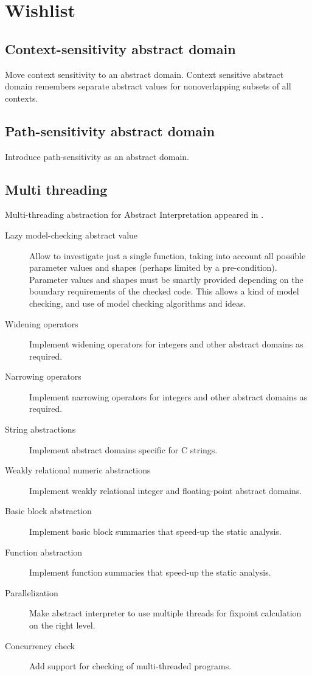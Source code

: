 \documentclass[a4paper]{book}
\begin{document}
\chapter{Wishlist}

\section{Context-sensitivity abstract domain}
Move context sensitivity to an abstract domain.  Context sensitive
abstract domain remembers separate abstract values for nonoverlapping
subsets of all contexts.

\section{Path-sensitivity abstract domain}
Introduce path-sensitivity as an abstract domain.

\section{Multi threading}
Multi-threading abstraction for Abstract Interpretation appeared in
\cite{M11}.

\begin{description}
\item[Lazy model-checking abstract value] Allow to investigate just a
  single function, taking into account all possible parameter values
  and shapes (perhaps limited by a pre-condition).  Parameter values
  and shapes must be smartly provided depending on the boundary
  requirements of the checked code.  This allows a kind of model
  checking, and use of model checking algorithms and ideas.
\item[Widening operators] Implement widening operators for integers
  and other abstract domains as required.
\item[Narrowing operators] Implement narrowing operators for integers
  and other abstract domains as required.
\item[String abstractions] Implement abstract domains specific for C
  strings.
\item[Weakly relational numeric abstractions] Implement weakly
  relational integer and floating-point abstract domains.
\item[Basic block abstraction] Implement basic block summaries that
  speed-up the static analysis.
\item[Function abstraction] Implement function summaries that speed-up
  the static analysis.
\item[Parallelization] Make abstract interpreter to use multiple
  threads for fixpoint calculation on the right level.
\item[Concurrency check] Add support for checking of multi-threaded
  programs.
\end{description}
\end{document}
